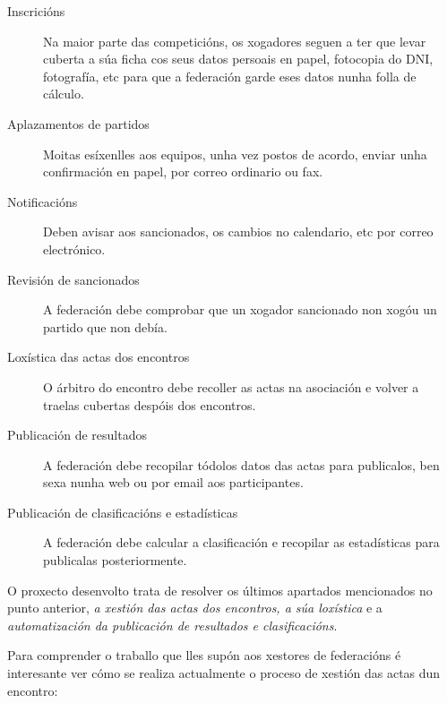     \begin{description}
     \item [Inscricións] Na maior parte das competicións, os xogadores seguen a ter que 
levar cuberta a súa ficha cos seus datos persoais en papel, fotocopia do DNI, fotografía, 
etc para que a federación garde eses datos nunha folla de cálculo.
     \item [Aplazamentos de partidos] Moitas esíxenlles aos equipos, unha vez postos de 
acordo, enviar unha confirmación en papel, por correo ordinario ou fax.
     \item [Notificacións] Deben avisar aos sancionados, os cambios no calendario, etc 
por correo electrónico.
     \item [Revisión de sancionados] A federación debe comprobar que un xogador 
sancionado non xogóu un partido que non debía.
     \item [Loxística das actas dos encontros] O árbitro do encontro debe recoller as 
actas na asociación e volver a traelas cubertas despóis dos encontros.
     \item [Publicación de resultados] A federación debe recopilar tódolos datos das 
actas para publicalos, ben sexa nunha web ou por email aos participantes.
     \item [Publicación de clasificacións e estadísticas] A federación debe calcular a 
clasificación e recopilar as estadísticas para publicalas posteriormente.
    \end{description}

    O proxecto desenvolto trata de resolver os últimos apartados mencionados no 
punto anterior, \emph{a xestión das actas dos encontros, a súa loxística} e a 
\emph{automatización da publicación de resultados e clasificacións}.

    Para comprender o traballo que lles supón aos xestores de 
federacións é interesante ver cómo se realiza actualmente o proceso de xestión 
das actas dun encontro:
%

